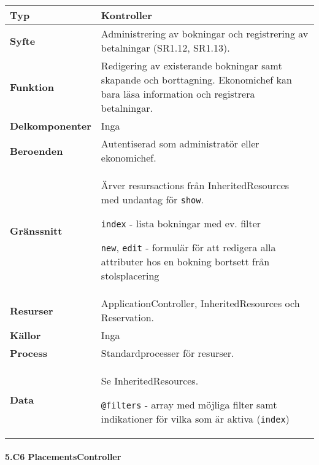 \documentclass[a4paper, twoside, 11pt, titlepage]{article}
\begin{document}
			\begin {table} [ht] \begin{tabular} {  p{3.5cm} p{11.6cm} }
				\hline
				{\sffamily\textbf{Typ}} & {Kontroller} \\
				\hline
				{\sffamily\textbf{Syfte}} & {Administrering av bokningar och registrering av betalningar (SR1.12, SR1.13).} \\
				\hline
				{\sffamily\textbf{Funktion}} & {Redigering av existerande bokningar samt skapande och borttagning. Ekonomichef kan bara läsa information och registrera betalningar.} \\
				\hline
				{\sffamily\textbf{Delkomponenter}} & {Inga} \\
				\hline
				{\sffamily\textbf{Beroenden}} & {Autentiserad som administratör eller ekonomichef.} \\
				\hline
				{\sffamily\textbf{Gränssnitt}} & {Ärver resursactions från InheritedResources med undantag för {\tt show}.

{\tt index} - lista bokningar med ev. filter

{\tt new}, {\tt edit} - formulär för att redigera alla attributer hos en bokning bortsett från stolsplacering} \\
				\hline
				{\sffamily\textbf{Resurser}} & {ApplicationController, InheritedResources och Reservation.} \\
				\hline
				{\sffamily\textbf{Källor}} & {Inga} \\
				\hline
				{\sffamily\textbf{Process}} & {Standardprocesser för resurser.} \\
				\hline
				{\sffamily\textbf{Data}} & {Se InheritedResources.

{\tt @filters} - array med möjliga filter samt indikationer för vilka som är aktiva ({\tt index})} \\
				\hline
			\end{tabular} \end{table} \FloatBarrier


			\clearpage %
			\paragraph{5.C6 PlacementsController}\
\end{document}
